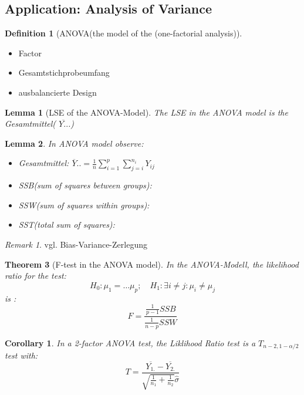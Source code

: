 \documentclass[a4paper,12pt, oneside, fleqn]{book}
\newtheorem{theorem}{Theorem}[section]
\newtheorem{corollary}{Corollary}[theorem]
\newtheorem{lemma}[theorem]{Lemma}
\theoremstyle{definition}
\newtheorem{definition}{Definition}[section]
\theoremstyle{remark}
\newtheorem*{remark}{Remark}
\begin{document}
\subsection{Application: Analysis of Variance}
\begin{definition}[ANOVA(the model of the (one-factorial analysis)]
\begin{itemize}
    \item Factor
    \item Gesamtstichprobeumfang
    \item ausbalancierte Design
\end{itemize}
\end{definition}

\begin{lemma}[LSE of the ANOVA-Model]
The LSE in the ANOVA model is the Gesamtmittel( $\overline{Y..}$.)
\end{lemma}

\begin{lemma}
In ANOVA model observe:
\begin{itemize}
    \item Gesamtmittel: $\overline{Y}.. = \frac{1}{n} \sum_{i = 1} ^ {p} \sum_{j = i}^{n_{i}} Y_{ij} $
     \item SSB(sum of squares between groups): 
    \item SSW(sum of squares within groups):
    \item SST(total sum of squares): 
\end{itemize}
\end{lemma}

\begin{remark}
vgl. Bias-Variance-Zerlegung
\end{remark}

\begin{theorem}[F-test in the ANOVA model]
In the ANOVA-Modell, the likelihood ratio for the test:
\begin{equation*}
    H_0: \mu_1 = \dots \mu_p; \quad H_1: \exists i \neq j: \mu_i \neq \mu_j
\end{equation*}
is :
\begin{equation}
    F = \frac{\frac{1}{p -1}SSB}{\frac{1}{n - p}SSW}
\end{equation}
\end{theorem}

\begin{corollary}
In a 2-factor ANOVA test, the Liklihood Ratio test is a $T_{n - 2, 1-\alpha/2}$ test with:
\begin{equation}
    T = \frac{\overline{Y_{1.}} - \overline{Y_{2.}}}{\sqrt{\frac{1}{  n_1} + \frac{1}{n_2}}\hat{\sigma}}
\end{equation}
\end{corollary}
\end{document}
